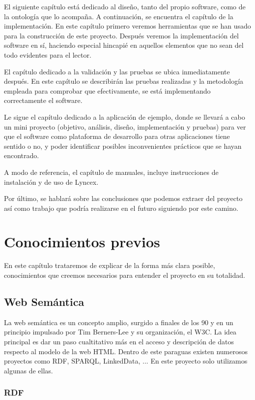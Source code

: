 \documentclass[12pt]{report} %
\begin{document}
El siguiente capítulo está dedicado al diseño, tanto del propio software, como de la ontología que lo acompaña. A continuación, se encuentra el capítulo de la implementación. En este capítulo primero veremos herramientas que se han usado para la construcción de este proyecto. Después veremos la implementación del software en sí, haciendo especial hincapié en aquellos elementos que no sean del todo evidentes para el lector.

El capítulo dedicado a la validación y las pruebas se ubica inmediatamente después. En este capítulo se describirán las pruebas realizadas y la metodología empleada para comprobar que efectivamente, se está implementando correctamente el software.

Le sigue el capítulo dedicado a la aplicación de ejemplo, donde se llevará a cabo un mini proyecto (objetivo, análisis, diseño, implementación y pruebas) para ver que el software como plataforma de desarrollo para otras aplicaciones tiene sentido o no, y poder identificar posibles inconvenientes prácticos que se hayan encontrado.

A modo de referencia, el capítulo de manuales, incluye instrucciones de instalación y de uso de Lyncex.

Por último, se hablará sobre las conclusiones que podemos extraer del proyecto así como trabajo que podría realizarse en el futuro siguiendo por este camino.


\chapter{Conocimientos previos}

En este capítulo trataremos de explicar de la forma más clara posible, conocimientos que creemos necesarios para entender el proyecto en su totalidad.

\section{Web Semántica}

La web semántica es un concepto amplio, surgido a finales de los 90 y en un principio impulsado por Tim Berners-Lee y su organización, el W3C. La idea principal es dar un paso cualtitativo más en el acceso y descripción de datos respecto al modelo de la web HTML. Dentro de este paraguas existen numerosos proyectos como RDF, SPARQL, LinkedData, ... En este proyecto solo utilizamos algunas de ellas.

\subsection{RDF}
\end{document}
